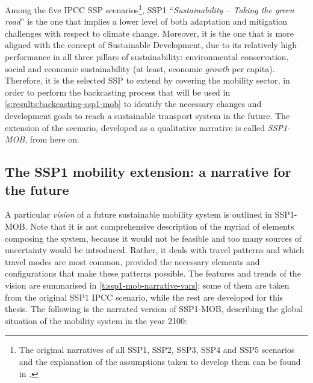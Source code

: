 Among the five IPCC SSP scenarios\footnote{The original narratives of all SSP1, SSP2, SSP3, SSP4 and SSP5 scenarios and the explanation of the assumptions taken to develop them can be found in \textcite{oneill2017_roadsaheadNarratives}.}, SSP1 ``\textit{Sustainability -- Taking the green road}'' is the one that implies a lower level of both adaptation and mitigation challenges with respect to climate change. Moreover, it is the one that is more aligned with the concept of Sustainable Development, due to its relatively high performance in all three pillars of sustainability: environmental conservation, social and economic sustainability (at least, economic \textit{growth} per capita). Therefore, it is the selected SSP to extend by covering the mobility sector, in order to perform the backcasting process that will be used in \cref{s:results:backcasting-ssp1-mob} to identify the necessary changes and development goals to reach a sustainable transport system in the future. The extension of the scenario, developed as a qualitative narrative is called \textit{SSP1-MOB}, from here on.

\subsection[The SSP1 mobility extension]{The SSP1 mobility extension: a narrative for the future}
\label{ss:results:ssp1-mob-development}
A particular \textit{vision} of a future sustainable mobility system is outlined in SSP1-MOB. Note that it is not comprehensive description of the myriad of elements composing the system, because it would not be feasible and too many sources of uncertainty would be introduced. Rather, it deals with travel patterns and which travel modes are most common, provided the necessary elements and configurations that make these patterns possible. The features and trends of the vision are summarised in \cref{t:ssp1-mob-narrative-vars}; some of them are taken from the original SSP1 IPCC scenario, while the rest are developed for this thesis. The following is the narrated version of SSP1-MOB, describing the global situation of the mobility system in the year 2100:

